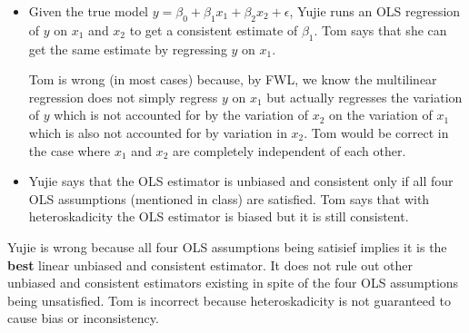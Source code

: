 \documentclass[11pt]{SelfArxOneColBMN}
\begin{document}
\begin{exercise}
\begin{itemize}
\begin{solution}
		\end{solution}
		\item Given the true model $y = \beta_0 + \beta_1x_1 + \beta_2x_2 + \epsilon$, Yujie runs an OLS regression of $y$ on $x_1$ and $x_2$ to get a consistent estimate of $\beta_1$. Tom says that she can get the same estimate by regressing $y$ on $x_1$.
		\begin{solution}
			Tom is wrong (in most cases) because, by FWL, we know the multilinear regression does not simply regress $y$ on $x_1$ but actually regresses the variation of $y$ which is not accounted for by the variation of $x_2$ on the variation of $x_1$ which is also not accounted for by variation in $x_2$. Tom would be correct in the case where $x_1$ and $x_2$ are completely independent of each other.
		\end{solution}
		\item Yujie says that the OLS estimator is unbiased and consistent only if all four OLS assumptions (mentioned in class) are satisfied. Tom says that with heteroskadicity the OLS estimator is biased but it is still consistent.
	\end{itemize}
	\begin{solution}
		Yujie is wrong because all four OLS assumptions being satisief implies it is the \textbf{best} linear unbiased and consistent estimator. It does not rule out other unbiased and consistent estimators existing in spite of the four OLS assumptions being unsatisfied. Tom is incorrect because heteroskadicity is not guaranteed to cause bias or inconsistency.
	\end{solution}
\end{exercise}
\bigskip
\end{document}

